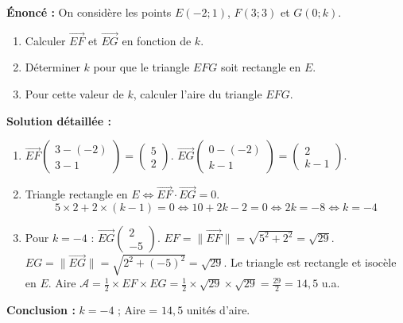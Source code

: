 \documentclass[11pt]{article}
\begin{document}
\begin{exoresolu}
    \textbf{Énoncé :} On considère les points $E(-2;1)$, $F(3;3)$ et $G(0;k)$.
    \begin{enumerate}
        \item Calculer $\overrightarrow{EF}$ et $\overrightarrow{EG}$ en fonction de $k$.
        \item Déterminer $k$ pour que le triangle $EFG$ soit rectangle en $E$.
        \item Pour cette valeur de $k$, calculer l'aire du triangle $EFG$.
    \end{enumerate}
    \tcblower
    \textbf{Solution détaillée :}
    \begin{enumerate}
        \item $\overrightarrow{EF}\begin{pmatrix} 3-(-2) \\ 3-1 \end{pmatrix} = \begin{pmatrix} 5 \\ 2 \end{pmatrix}$.
        $\overrightarrow{EG}\begin{pmatrix} 0-(-2) \\ k-1 \end{pmatrix} = \begin{pmatrix} 2 \\ k-1 \end{pmatrix}$.
        \item Triangle rectangle en $E \iff \overrightarrow{EF}\cdot\overrightarrow{EG}=0$.
        \[
        5\times 2 + 2\times(k-1) = 0 \iff 10 + 2k - 2 = 0 \iff 2k = -8 \iff k = -4
        \]
        \item Pour $k=-4$ : $\overrightarrow{EG}\begin{pmatrix} 2 \\ -5 \end{pmatrix}$.
        $EF = \|\overrightarrow{EF}\| = \sqrt{5^2+2^2} = \sqrt{29}$.
        $EG = \|\overrightarrow{EG}\| = \sqrt{2^2+(-5)^2} = \sqrt{29}$.
        Le triangle est rectangle et isocèle en $E$.
        Aire $\mathcal{A} = \frac{1}{2} \times EF \times EG = \frac{1}{2} \times \sqrt{29} \times \sqrt{29} = \frac{29}{2} = 14,5$ u.a.
    \end{enumerate}
    \textbf{Conclusion :} $k=-4$ ; Aire = $14,5$ unités d'aire.
\end{exoresolu}
\end{document}
